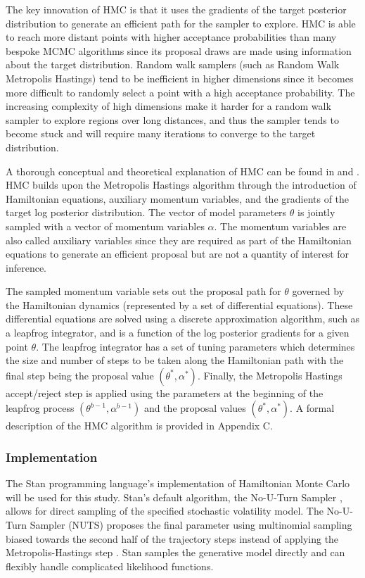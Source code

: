 \documentclass[12pt, a4paper]{article}
\begin{document}
        The key innovation of HMC is that it uses the gradients of the target posterior distribution to generate an efficient path for the sampler to explore. HMC is able to reach more distant points with higher acceptance probabilities than many bespoke MCMC algorithms since its  proposal draws are made using information about the target distribution. Random walk samplers (such as Random Walk Metropolis Hastings) tend to be inefficient in higher dimensions since it becomes more difficult to randomly select a point with a high acceptance probability. The increasing complexity of high dimensions make it harder for a random walk sampler to explore regions over long distances, and thus the sampler tends to become stuck and will require many iterations to converge to the target distribution. 

        A thorough conceptual and theoretical explanation of HMC can be found in \citet{gelman2013bayesian} and \citet{betancourt2017conceptual}. HMC builds upon the Metropolis Hastings algorithm through the introduction of Hamiltonian equations, auxiliary momentum variables, and the gradients of the target log posterior distribution. The vector of model parameters $\theta$ is jointly sampled with a vector of momentum variables $\alpha$. The momentum variables are also called auxiliary variables since they are required as part of the Hamiltonian equations to generate an efficient proposal but are not a quantity of interest for inference.

        The sampled momentum variable sets out the proposal path for $\theta$ governed by the Hamiltonian dynamics (represented by a set of differential equations). These differential equations are solved using a discrete approximation algorithm, such as a leapfrog integrator, and is a function of the log posterior gradients for a given point $\theta$. The leapfrog integrator has a set of tuning parameters which determines the size and number of steps to be taken along the Hamiltonian path with the final step being the proposal value $(\theta^{\ast}, \alpha^{\ast})$. Finally, the Metropolis Hastings accept/reject step is applied using the parameters at the beginning of the leapfrog process $(\theta^{b-1}, \alpha^{b-1})$ and the proposal values $(\theta^{\ast}, \alpha^{\ast})$. A formal description of the HMC algorithm is provided in Appendix C.

        \subsubsection{Implementation}
        The Stan programming language's implementation of Hamiltonian Monte Carlo will be used for this study. Stan's default algorithm, the No-U-Turn Sampler \citep{hoffman2014no}, allows for direct sampling of the specified stochastic volatility model. The No-U-Turn Sampler (NUTS) proposes the final parameter using multinomial sampling biased towards the second half of the trajectory steps instead of applying the Metropolis-Hastings step \citep{betancourt2016identifying}. Stan samples the generative model directly and can flexibly handle complicated likelihood functions. 
        
\end{document}
